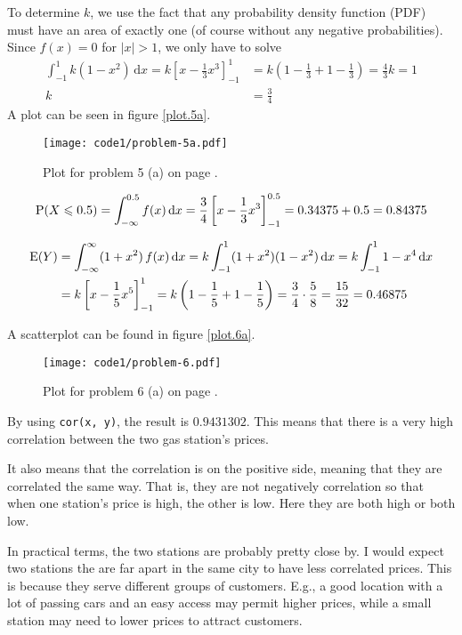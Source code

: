 \documentclass[a4paper,english,12pt]{article}
\begin{document}
To determine $k$, we use the fact that any probability density function (PDF)
must have an area of exactly one (of course without any negative
probabilities). Since $f(x) = 0$ for $|x| > 1$, we only have to solve
\begin{align*}
  \int_{-1}^{1}k(1-x^2)\, \mathrm{d}x =
  k\left[ x - \frac{1}{3}{x^3} \right]_{-1}^{1} &=
  k\left( 1 - \frac{1}{3} + 1 - \frac{1}{3} \right) = \frac{4}{3}k = 1 \\
   k &= \frac{3}{4}
\end{align*}
A plot can be seen in figure \vref{plot.5a}.
\begin{figure}[H]
  \texttt{[image: code1/problem-5a.pdf]}
  \caption{Plot for problem 5 (a) on page \pageref{problem.5 (a)}.}
  \label{plot.5a}
\end{figure}

\[
  \mathrm{P}(X \leqslant 0.5) = 
    \int_{-\infty}^{0.5} f(x)\, \mathrm{d}x =
  \frac{3}{4}\left[ x - \frac{1}{3}{x^3} \right]_{-1}^{0.5} =
    0.34375 + 0.5 = 0.84375
\]

\begin{align*}
  \mathrm{E}(Y) &=
    \int_{-\infty}^{\infty} (1+x^2)\, f(x)\, \mathrm{d}x =
    k\int_{-1}^{1} (1+x^2)(1-x^2) \, \mathrm{d}x =
    k\int_{-1}^{1} 1 - x^4 \, \mathrm{d}x \\ &=
    k\left[ x - \frac{1}{5} x^5 \right]_{-1}^{1} =
    k\left( 1 - \frac{1}{5} + 1 - \frac{1}{5} \right) = \frac{3}{4}\cdot\frac{5}{8}
      = \frac{15}{32} = 0.46875
\end{align*}

A scatterplot can be found in figure \vref{plot.6a}.
\begin{figure}[H]
  \texttt{[image: code1/problem-6.pdf]}
  \caption{Plot for problem 6 (a) on page \pageref{problem.6 (a)}.}
  \label{plot.6a}
\end{figure}

By using \texttt{cor(x, y)}, the result is $0.9431302$. This means that there
is a very high correlation between the two gas station's prices.

It also means that the correlation is on the positive side, meaning that they
are correlated the same way. That is, they are not negatively correlation so
that when one station's price is high, the other is low. Here they are both
high or both low.

In practical terms, the two stations are probably pretty close by. I would
expect two stations the are far apart in the same city to have less correlated
prices. This is because they serve different groups of customers. E.g., a good
location with a lot of passing cars and an easy access may permit higher
prices, while a small station may need to lower prices to attract customers.
\end{document}
